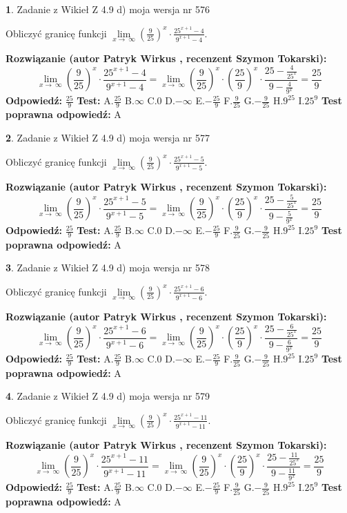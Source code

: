 \documentclass[12pt, a4paper]{article}
\theoremstyle{definition} %
\newtheorem{zad}{}
\newcommand{\zadStart}[1]{\begin{zad}#1\newline}
\newcommand{\zadStop}{\end{zad}}
\newcommand{\rozwStart}[2]{\noindent \textbf{Rozwiązanie (autor #1 , recenzent #2): }\newline}
\newcommand{\rozwStop}{\newline}
\newcommand{\odpStart}{\noindent \textbf{Odpowiedź:}\newline}
\newcommand{\odpStop}{\newline}
\newcommand{\testStart}{\noindent \textbf{Test:}\newline}
\newcommand{\testStop}{\newline}
\newcommand{\kluczStart}{\noindent \textbf{Test poprawna odpowiedź:}\newline}
\newcommand{\kluczStop}{\newline}
\begin{document}
\zadStart{Zadanie z Wikieł Z 4.9 d) moja wersja nr 576}


Obliczyć granicę funkcji  $\lim\limits_{x\to\ \infty}(\frac{9}{25})^{x}\cdot\frac{25^{x+1}-4}{9^{x+1}-4}$.
\zadStop
\rozwStart{Patryk Wirkus}{Szymon Tokarski}
$$\lim\limits_{x\to\ \infty}(\frac{9}{25})^{x}\cdot\frac{25^{x+1}-4}{9^{x+1}-4}=\lim\limits_{x\to\ \infty}(\frac{9}{25})^{x}\cdot(\frac{25}{9})^{x} \cdot \frac{25-\frac{4}{25^{x}}}{9-\frac{4}{9^{x}}} = \frac{25}{9}$$
\rozwStop
\odpStart
$\frac{25}{9}$
\odpStop
\testStart
A.$\frac{25}{9}$ B.$\infty$ C.$0$ D.$-\infty$ E.$-\frac{25}{9}$
F.$\frac{9}{25}$ G.$-\frac{9}{25}$
H.$9^{25}$
I.$25^{9}$
\testStop
\kluczStart
A
\kluczStop



\zadStart{Zadanie z Wikieł Z 4.9 d) moja wersja nr 577}


Obliczyć granicę funkcji  $\lim\limits_{x\to\ \infty}(\frac{9}{25})^{x}\cdot\frac{25^{x+1}-5}{9^{x+1}-5}$.
\zadStop
\rozwStart{Patryk Wirkus}{Szymon Tokarski}
$$\lim\limits_{x\to\ \infty}(\frac{9}{25})^{x}\cdot\frac{25^{x+1}-5}{9^{x+1}-5}=\lim\limits_{x\to\ \infty}(\frac{9}{25})^{x}\cdot(\frac{25}{9})^{x} \cdot \frac{25-\frac{5}{25^{x}}}{9-\frac{5}{9^{x}}} = \frac{25}{9}$$
\rozwStop
\odpStart
$\frac{25}{9}$
\odpStop
\testStart
A.$\frac{25}{9}$ B.$\infty$ C.$0$ D.$-\infty$ E.$-\frac{25}{9}$
F.$\frac{9}{25}$ G.$-\frac{9}{25}$
H.$9^{25}$
I.$25^{9}$
\testStop
\kluczStart
A
\kluczStop



\zadStart{Zadanie z Wikieł Z 4.9 d) moja wersja nr 578}


Obliczyć granicę funkcji  $\lim\limits_{x\to\ \infty}(\frac{9}{25})^{x}\cdot\frac{25^{x+1}-6}{9^{x+1}-6}$.
\zadStop
\rozwStart{Patryk Wirkus}{Szymon Tokarski}
$$\lim\limits_{x\to\ \infty}(\frac{9}{25})^{x}\cdot\frac{25^{x+1}-6}{9^{x+1}-6}=\lim\limits_{x\to\ \infty}(\frac{9}{25})^{x}\cdot(\frac{25}{9})^{x} \cdot \frac{25-\frac{6}{25^{x}}}{9-\frac{6}{9^{x}}} = \frac{25}{9}$$
\rozwStop
\odpStart
$\frac{25}{9}$
\odpStop
\testStart
A.$\frac{25}{9}$ B.$\infty$ C.$0$ D.$-\infty$ E.$-\frac{25}{9}$
F.$\frac{9}{25}$ G.$-\frac{9}{25}$
H.$9^{25}$
I.$25^{9}$
\testStop
\kluczStart
A
\kluczStop



\zadStart{Zadanie z Wikieł Z 4.9 d) moja wersja nr 579}


Obliczyć granicę funkcji  $\lim\limits_{x\to\ \infty}(\frac{9}{25})^{x}\cdot\frac{25^{x+1}-11}{9^{x+1}-11}$.
\zadStop
\rozwStart{Patryk Wirkus}{Szymon Tokarski}
$$\lim\limits_{x\to\ \infty}(\frac{9}{25})^{x}\cdot\frac{25^{x+1}-11}{9^{x+1}-11}=\lim\limits_{x\to\ \infty}(\frac{9}{25})^{x}\cdot(\frac{25}{9})^{x} \cdot \frac{25-\frac{11}{25^{x}}}{9-\frac{11}{9^{x}}} = \frac{25}{9}$$
\rozwStop
\odpStart
$\frac{25}{9}$
\odpStop
\testStart
A.$\frac{25}{9}$ B.$\infty$ C.$0$ D.$-\infty$ E.$-\frac{25}{9}$
F.$\frac{9}{25}$ G.$-\frac{9}{25}$
H.$9^{25}$
I.$25^{9}$
\testStop
\kluczStart
A
\kluczStop
\end{document}
